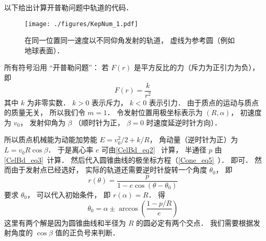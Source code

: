 
\begin{issues}
\issueDraft
{}
\end{issues}


以下给出计算开普勒问题中轨道的代码．
\begin{figure}[ht]
\centering
\texttt{[image: ./figures/KepNum\_1.pdf]}
\caption{在同一位置同一速度以不同仰角发射的轨道， 虚线为参考圆（例如地球表面）．} \label{KepNum_fig1}
\end{figure}

所有符号沿用 “开普勒问题”： 若 $F(r)$ 是平方反比的力（斥力为正引力为负）， 即
\begin{equation}
F(r) = \frac{k}{r^2}
\end{equation}
其中 $k$ 为非零实数． $k>0$ 表示斥力， $k<0$ 表示引力． 由于质点的运动与质点的质量无关， 所以我们令 $m=1$． 令发射位置用极坐标表示为 $(R,\alpha)$， 初速度为 $v_0$， 发射仰角为 $\beta$ （顺时针为正， $\beta=0$ 时速度延逆时针方向）．

所以质点机械能为动能加势能 $E = v_0^2/2 + k/R$， 角动量（逆时针为正）为 $L = v_0 R\cos\beta$． 于是离心率 $e$ 可由\autoref{CelBd_eq2}~ 计算， 半通径 $p$ 由\autoref{CelBd_eq3}~计算． 然后代入圆锥曲线的极坐标方程（\autoref{Cone_eq5}~）． 即可． 然而由于发射点已经选好， 实际的轨道还需要逆时针旋转一个角度 $\theta_0$， 即
\begin{equation}
r(\theta)  = \frac{p}{1 - e\cos (\theta-\theta_0)}
\end{equation}
要求 $\theta_0$， 可以代入初始条件， 即 $r(\alpha) = R$． 得
\begin{equation}
\theta_0 = \alpha \pm \arccos(\frac{1-p/R}{e})
\end{equation}
这里有两个解是因为圆锥曲线和半径为 $R$ 的圆必定有两个交点． 我们需要根据发射角度的 $\cos\beta$ 值的正负号来判断． 

